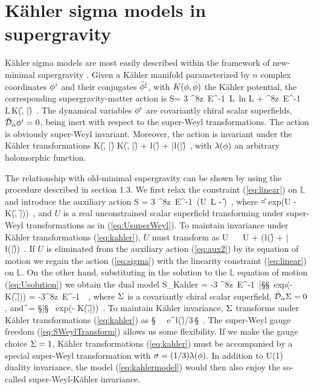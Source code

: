 \vskip0.5cm
\section{K{\"a}hler sigma models in supergravity}\label{sec:kahler-sugra}
\noindent K{\"a}hler sigma models are most easily described within the framework of new-minimal supergravity \cite{Ferrara:1983dh}. Given a K{\"a}hler manifold parameterized by $n$ complex coordinates $\f^{i}$ and their conjugates ${\bar \f}^{\underline i}$, with $K(\f,{\bar \f})$ the K{\"a}hler potential, the corresponding supergravity-matter action is
\be
\label{eq:sigma}
S= 3 {\int\!^8z}\, E^{-1}\,
{\mathbb L}\, {\rm ln} {\mathbb L} + {\int\!^8z}\, E^{-1}\,
{\mathbb L}\,K(\f, \bar \f )~.
\ee
The dynamical variables $\f^{i}$ are covariantly chiral scalar superfields, ${\bar \cD}_\ad \f^{i}=0 $, being inert with respect to the super-Weyl transformations. The action is obviously super-Weyl invariant. Moreover, the action is invariant under the K\"ahler transformations
\be
\label{eq:kahler}
K(\f, \bar \f) \to K(\f, \bar \f) + \l(\f) + \bar \l(\bar \f)~,
\ee
with $\l(\f)$ an arbitrary holomorphic function.

The relationship with old-minimal supergravity can be shown by using the procedure described in section 1.3. We first relax the constraint (\ref{eq:linear}) on ${\mathbb L}$ and introduce the auxiliary action
\be
\label{eq:aux2}
S = 3 {\int\!^8z}\, E^{-1}\,
\left(U\, {\mathbb L} - \U\right)~,
\ee
where
\be
\label{eq:upsilon}
\U  = {\rm exp}\!\left(U - 
K(\f, {\bar \f})\right)~,
\ee
and $U$ is a real unconstrained scalar superfield transforming under super-Weyl transformations as in (\ref{eq:UsuperWeyl}). To maintain invariance under K\"ahler transformations (\ref{eq:kahler}), $U$ must transform as
\be
U ~\to~ U + \left(\l(\f) + \bar \l(\bar \f)\right)~.
\ee
If $U$ is eliminated from the auxiliary action (\ref{eq:aux2}) by its equation of motion we regain the action (\ref{eq:sigma}) with the linearity constraint (\ref{eq:linear}) on ${\mathbb L}$. On the other hand, substituting in the solution to the ${\mathbb L}$ equation of motion (\ref{eq:Usolution}) we obtain the dual model
\be
\label{eq:kahlermodel}
S_{\rm Kahler} = -3  \int\!^8z\, E^{-1}\,
{\bar \S}\S \, 
{\rm exp}\!\left(- K\!(\f,{\bar \f})\right)
=  -3\int\!^8z\, E^{-1}\, \tilde{\U}~,
\ee
where $\S$ is a covariantly chiral scalar superfield, ${\bar \cD}_\ad\S=0$, and
\be
\label{eq:tilde-upsilon}
{\tilde \U} = \S{\bar \S} \,
{\rm exp}\!\left(- K\!(\f,{\bar \f})\right)~.
\ee
To maintain K{\"a}hler invariance, $\S$ transforms under K{\"a}hler transformations (\ref{eq:kahler}) as
\be
\S ~\to~ {\rm e}^{\l(\f)/3}\,\S~.
\ee
The super-Weyl gauge freedom (\ref{eq:SWeylTransform}) allows us some flexibility. If we make the gauge choice $\S=1$, K{\"a}hler transformations (\ref{eq:kahler}) must be accompanied by a special super-Weyl transformation with $\s=(1/3)\l(\f)$. In addition to U(1) duality invariance, the model (\ref{eq:kahlermodel}) would then also enjoy the so-called super-Weyl-K{\"a}hler invariance.


